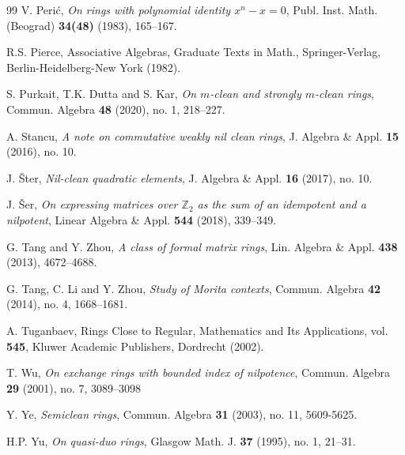 \documentclass[12pt]{amsart}
\theoremstyle{definition}
\theoremstyle{remark}
\numberwithin{equation}{section}
\begin{document}
\begin{thebibliography}{99}
V. Peri\'c, {\it On rings with polynomial identity $x^n-x=0$}, Publ. Inst. Math. (Beograd) \textbf{34(48)} (1983), 165--167.

R.S. Pierce, Associative Algebras, Graduate Texts in Math., Springer-Verlag, Berlin-Heidelberg-New York (1982).

S. Purkait, T.K. Dutta and S. Kar, {\it On $m$-clean and strongly $m$-clean rings}, Commun. Algebra \textbf{48} (2020), no. 1, 218--227.

A. Stancu, {\it A note on commutative weakly nil clean rings}, J. Algebra \& Appl. \textbf{15} (2016), no. 10.

J. \v{S}ter, {\it Nil-clean quadratic elements}, J. Algebra \& Appl. {\bf 16} (2017), no. 10.

J. \v{S}er, {\it On expressing matrices over $\mathbb{Z}_2$ as the sum of an idempotent and a nilpotent}, Linear Algebra \& Appl. \textbf{544} (2018), 339--349.

G. Tang and Y. Zhou, {\it A class of formal matrix rings}, Lin. Algebra \& Appl. \textbf{438} (2013), 4672--4688.

G. Tang, C. Li and Y. Zhou, {\it Study of Morita contexts}, Commun. Algebra \textbf{42} (2014), no. 4, 1668--1681.

A. Tuganbaev, Rings Close to Regular, Mathematics and Its Applications, vol. {\bf 545}, Kluwer Academic Publishers, Dordrecht (2002).

T. Wu, {\it On exchange rings with bounded index of nilpotence}, Commun. Algebra {\bf 29} (2001), no. 7, 3089--3098

Y. Ye, {\it Semiclean rings}, Commun. Algebra \textbf{31} (2003), no. 11, 5609-5625.

H.P. Yu, {\it On quasi-duo rings}, Glasgow Math. J. \textbf{37} (1995), no. 1, 21--31.

\end{thebibliography}
\end{document}
